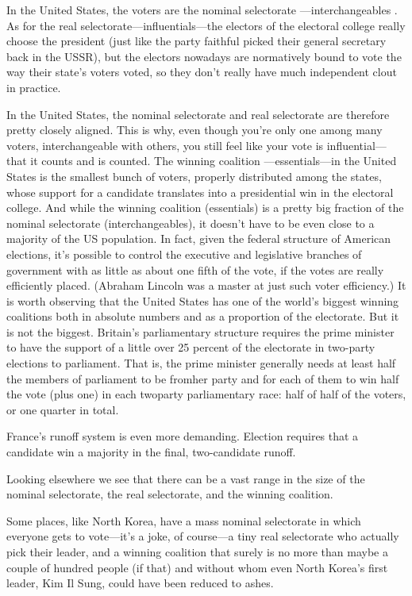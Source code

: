 \documentclass[10pt]{article}
\begin{document}
{\large In the United States, the voters are the nominal selectorate
---interchangeables . As for the real selectorate---influentials---the electors
of the electoral college really choose the president (just like the party
faithful picked their general secretary back in the USSR), but the electors
nowadays are normatively bound to vote the way their state's voters voted, so
they don't really have much independent clout in practice.}

{\large In the United States, the nominal selectorate and real selectorate are
therefore pretty closely aligned. This is why, even though you're only one among
many voters, interchangeable with others, you still feel like your vote is
influential---that it counts and is counted. The winning coalition
---essentials---in the United States is the smallest bunch of voters, properly
distributed among the states, whose support for a candidate translates into a
presidential win in the electoral college. And while the winning coalition
(essentials) is a pretty big fraction of the nominal selectorate
(interchangeables), it doesn't have to be even close to a majority of the US
population. In fact, given the federal structure of American elections, it's
possible to control the executive and legislative branches of government with as
little as about one fifth of the vote, if the votes are really efficiently
placed. (Abraham Lincoln was a master at just such voter efficiency.) It is worth
observing that the United States has one of the world's biggest winning
coalitions both in absolute numbers and as a proportion of the electorate. But it
is not the biggest. Britain's parliamentary structure requires the prime minister
to have the support of a little over 25 percent of the electorate in two-party
elections to parliament. That is, the prime minister generally needs at least
half the members of parliament to be fromher party and for each of them to win
half the vote (plus one) in each twoparty parliamentary race: half of half of the
voters, or one quarter in total.}

{\large France's runoff system is even more demanding. Election requires that a
candidate win a majority in the final, two-candidate runoff.}

{\large Looking elsewhere we see that there can be a vast range in the size of
the nominal selectorate, the real selectorate, and the winning coalition.}

{\large Some places, like North Korea, have a mass nominal selectorate in which
everyone gets to vote---it's a joke, of course---a tiny real selectorate who
actually pick their leader, and a winning coalition that surely is no more than
maybe a couple of hundred people (if that) and without whom even North Korea's
first leader, Kim Il Sung, could have been reduced to ashes.}
\end{document}
